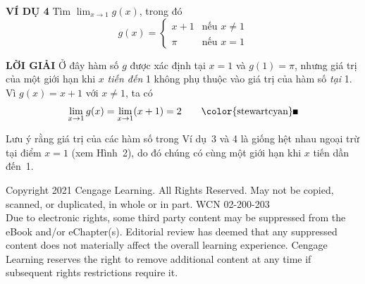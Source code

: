 \begin{minipage}[t]{0.71\textwidth}
    \vspace{0.2cm}
    \noindent
    \textbf{\textsf{\color{stewartcyan}VÍ DỤ 4}} \quad Tìm $\displaystyle \lim_{x \to 1} g(x)$, trong đó
    \[
    g(x) = \begin{cases}
    x + 1 & \text{nếu } x \neq 1 \\[3pt]
    \pi & \text{nếu } x = 1
    \end{cases}
    \]

    \vspace{0.15cm}
    \noindent
    \textbf{\textsf{\color{stewartcyan}LỜI GIẢI}} \quad Ở đây hàm số $g$ được xác định tại $x = 1$ và $g(1) = \pi$, nhưng giá trị của một giới hạn khi $x$ \textit{tiến đến} 1 không phụ thuộc vào giá trị của hàm số \textit{tại} 1. Vì $g(x) = x + 1$ với $x \neq 1$, ta có
    \[
    \lim_{x \to 1} g(x) = \lim_{x \to 1} (x + 1) = 2 \tag*{\color{stewartcyan}\rule{1.1ex}{1.1ex}}
    \]

    \vspace{0.15cm}
    \noindent
    Lưu ý rằng giá trị của các hàm số trong Ví dụ~3 và 4 là giống hệt nhau ngoại trừ tại điểm $x = 1$ (xem Hình~2), do đó chúng có cùng một giới hạn khi $x$ tiến dần đến~1.
\end{minipage}

\vfill
\begin{center}
\fontsize{6.5pt}{8pt}\selectfont\color{stewartgray}
Copyright 2021 Cengage Learning. All Rights Reserved. May not be copied, scanned, or duplicated, in whole or in part. WCN 02-200-203\\[1pt]
Due to electronic rights, some third party content may be suppressed from the eBook and/or eChapter(s). Editorial review has deemed that any suppressed content does not materially affect the overall learning experience. Cengage Learning reserves the right to remove additional content at any time if subsequent rights restrictions require it.
\end{center}
